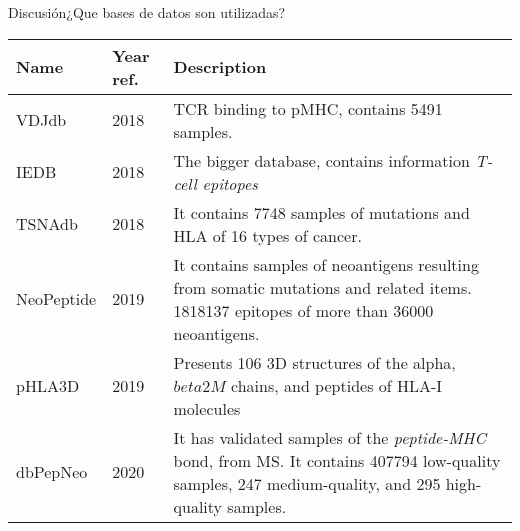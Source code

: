 \documentclass[10pt]{beamer}
\newcommand{\1}{
	\setbeamertemplate{background}{
		\texttt{[image: img/1]}
		\tikz[overlay] \fill[fill opacity=0.75,fill=white] (0,0) rectangle (-\paperwidth,\paperheight);
	}
}
\begin{document}
\begin{frame}{Discusión}{¿Que bases de datos son utilizadas?}
	
	\fontsize{7pt}{5pt}\selectfont
	
	\begin{table}[]
		\centering
				
		\setlength{\tabcolsep}{0.5em} %
		{\renewcommand{\arraystretch}{2}%
			\begin{tabular}{p{1.7cm}p{1.2cm}p{6.5cm}}
				\textbf{Name} & \textbf{Year ref.}                                                                & \textbf{Description}                                                                                                                                                                                      \\ \hline
				VDJdb           & 2018 \cite{shugay2018vdjdb}& TCR binding to pMHC, contains 5491 samples.                                                                                                                                           \\
				IEDB            & 2018 \cite{vita2019immune}                                           & The bigger database, contains information \textit{T-cell epitopes}                                                                                               \\
				TSNAdb          & 2018 \cite{wu2018tsnadb}                                             & It contains 7748 samples of mutations and HLA of 16 types of cancer.                                                                                                                           \\
				NeoPeptide      & 2019 \cite{zhou2019neopeptide}                                       & It contains samples of neoantigens resulting from somatic mutations and related items. 1818137 epitopes of more than 36000 neoantigens.
				\\
				pHLA3D          & 2019 \cite{e2019phla3d}                                              &
				Presents 106 3D structures of the alpha, $beta 2M$ chains, and peptides of HLA-I molecules                                                                                                            \\
				dbPepNeo        & 2020 \cite{tan2020dbpepneo}                                          & It has validated samples of the \textit{peptide-MHC} bond, from MS. It contains 407794 low-quality samples, 247 medium-quality, and 295 high-quality samples.

\end{tabular}}
\end{table}
\end{frame}
\end{document}
